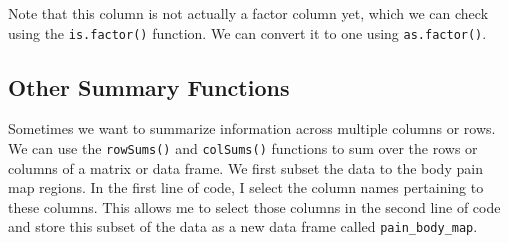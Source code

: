 \documentclass[
  letterpaper,
]{krantz}
\makeatletter
\newenvironment{Shaded}{\begin{snugshade}}{\end{snugshade}}
\newcommand{\CommentTok}[1]{\textcolor[rgb]{0.37,0.37,0.37}{#1}}
\newcommand{\FunctionTok}[1]{\textcolor[rgb]{0.28,0.35,0.67}{#1}}
\newcommand{\NormalTok}[1]{\textcolor[rgb]{0.00,0.23,0.31}{#1}}
\newcommand{\OtherTok}[1]{\textcolor[rgb]{0.00,0.23,0.31}{#1}}
\newcommand{\SpecialCharTok}[1]{\textcolor[rgb]{0.37,0.37,0.37}{#1}}
\newenvironment{kframe}{%
\medskip{}
\setlength{\fboxsep}{.8em}
 \def\at@end@of@kframe{}%
 \ifinner\ifhmode%
  \def\at@end@of@kframe{\end{minipage}}%
  \begin{minipage}{\columnwidth}%
 \fi\fi%
 \def\FrameCommand##1{\hskip\@totalleftmargin \hskip-\fboxsep
 \colorbox{shadecolor}{##1}\hskip-\fboxsep
     \hskip-\linewidth \hskip-\@totalleftmargin \hskip\columnwidth}%
 \MakeFramed {\advance\hsize-\width
   \@totalleftmargin\z@ \linewidth\hsize
   \@setminipage}}%
 {\par\unskip\endMakeFramed%
 \at@end@of@kframe}
\renewenvironment{Shaded}{\begin{kframe}}{\end{kframe}}
\makeatother
\begin{document}
Note that this column is not actually a factor column yet, which we can
check using the \texttt{is.factor()} function. We can convert it to one
using \texttt{as.factor()}.

\begin{Shaded}
\end{Shaded}

\begin{Shaded}
\end{Shaded}

\hypertarget{other-summary-functions}{%
\subsection{Other Summary Functions}\label{other-summary-functions}}

Sometimes we want to summarize information across multiple columns or
rows. We can use the \texttt{rowSums()} and \texttt{colSums()} functions
to sum over the rows or columns of a matrix or data frame. We first
subset the data to the body pain map regions. In the first line of code,
I select the column names pertaining to these columns. This allows me to
select those columns in the second line of code and store this subset of
the data as a new data frame called \texttt{pain\_body\_map}.
\end{document}
